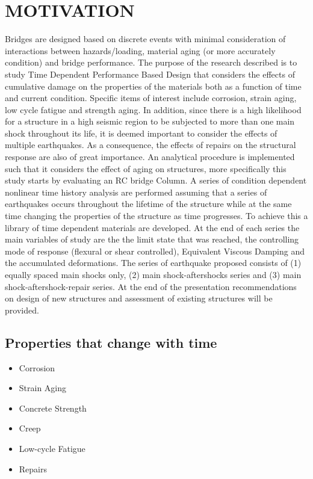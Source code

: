 \chapter{MOTIVATION}
\label{chap-one}

Bridges are designed based on discrete events with minimal consideration of interactions between hazards/loading, material aging (or more accurately condition) and bridge performance. The purpose of the research described is to study Time Dependent Performance Based Design that considers the effects of cumulative damage on the properties of the materials both as a function of time and current condition. Specific items of interest include corrosion, strain aging, low cycle fatigue and strength aging. In addition, since there is a high likelihood for a structure  in a high seismic region to be subjected to more than one main shock throughout its life, it is deemed important to consider the effects of multiple earthquakes. As a consequence, the effects of repairs on the structural response are also of great importance. An analytical procedure is implemented such that it considers the effect of aging on structures, more specifically this study starts by evaluating an RC bridge Column. A series of condition dependent nonlinear time history analysis are performed assuming that a series of earthquakes occurs throughout the lifetime of the structure while at the same time changing the properties of the structure as time progresses. To achieve this a library of time dependent materials are developed. At the end of each series the main variables of study are the the limit state that was reached, the controlling mode of response (flexural or shear controlled), Equivalent Viscous Damping and the accumulated deformations. The series of earthquake proposed consists of (1) equally spaced main shocks only, (2) main shock-aftershocks series and (3) main shock-aftershock-repair series. At the end of the presentation recommendations on design of new structures and assessment of existing structures will be provided.

\section{Properties that change with time}

\begin{itemize}
   \item Corrosion
   \item Strain Aging
   \item Concrete Strength
   \item Creep
   \item Low-cycle Fatigue
   \item Repairs
\end{itemize}

